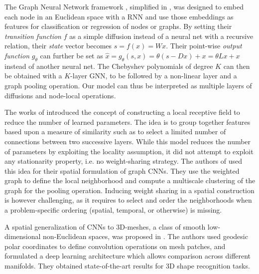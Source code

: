 \documentclass{article}
\newcommand{\todo}[1]{{\color{red} #1 }}
\begin{document}
The Graph Neural Network framework \cite{scarselli_gnn_2009}, simplified in
\cite{li_ggsnn_2015}, was designed to embed each node in an Euclidean space
with a RNN and use those embeddings as features for classification or
regression of nodes or graphs. By setting their \textit{transition function}
$f$ as a simple diffusion instead of a neural net with a recursive relation,
their \textit{state} vector becomes $s = f(x) = Wx$.  Their point-wise
\textit{output function} $g_\theta$ can further be set as $\hat{x} =
g_\theta(s, x) = \theta (s - Dx) + x = \theta Lx + x$ instead of another neural
net. The Chebyshev polynomials of degree $K$ can then be obtained with a
$K$-layer GNN, to be followed by a non-linear layer and a graph pooling
operation. Our model can thus be interpreted as multiple layers of diffusions
and node-local operations.

The works of \cite{pro:GregorLeCun10LRF, pro:CoatesNg11LRF} introduced the
concept of constructing a local receptive field to reduce the number of learned
parameters. The idea is to group together features based upon a measure of
similarity such as to select a limited number of connections between two
successive layers. While this model reduces the number of parameters by
exploiting the locality assumption, it did not attempt to exploit any
stationarity property, i.e. no weight-sharing strategy.
The authors of \cite{art:BrunaZarembaSzlamLeCun13DLgraphs} used this idea for
their spatial formulation of graph CNNs. They use the weighted graph to define
the local neighborhood and compute a multiscale clustering of the graph for the
pooling operation. Inducing weight sharing in a spatial construction is however
challenging, as it requires to select and order the neighborhoods when a
problem-specific ordering (spatial, temporal, or otherwise) is missing.

A spatial generalization of CNNs to 3D-meshes, a class of smooth
low-dimensional non-Euclidean spaces, was proposed in \cite{masci2015geodesic}.
The authors used geodesic polar coordinates to define convolution operations on
mesh patches, and formulated a deep learning architecture which allows
comparison across different manifolds. They obtained state-of-the-art results
for 3D shape recognition tasks.

\end{document}
